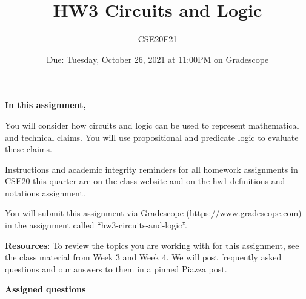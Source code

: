 \documentclass[12pt, oneside]{article}
\author{CSE20F21}
\title{HW3 Circuits and Logic}
\date{Due: Tuesday, October 26, 2021 at 11:00PM on Gradescope}
\begin{document}
\maketitle
\thispagestyle{fancy}

{\bf In this assignment,}

You will consider how circuits and logic can be used to represent
mathematical and technical claims. You will use propositional 
and predicate logic to evaluate these claims.

Instructions and academic integrity reminders for all homework assignments in 
CSE20 this quarter are on the class website and on the hw1-definitions-and-notations
assignment.

You will submit this assignment via Gradescope
(\href{https://www.gradescope.com}{https://www.gradescope.com}) 
in the assignment called ``hw3-circuits-and-logic''.

{\bf Resources}: To review the topics you are working with 
for this assignment, see the class material from Week 3 and Week 4.
We will post frequently asked questions and our answers to them in a 
pinned Piazza post.

{\bf Assigned questions}
\end{document}

